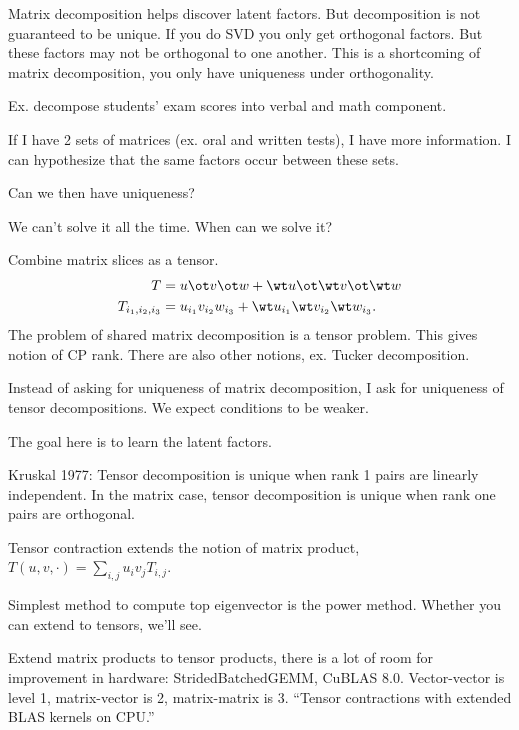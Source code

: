 Matrix decomposition helps discover latent factors. But decomposition is not guaranteed to be unique. If you do SVD you only get orthogonal factors. But these factors may not be orthogonal to one another. This is a shortcoming of matrix decomposition, you only have uniqueness under orthogonality.

Ex. decompose students' exam scores into verbal and math component.

If I have 2 sets of matrices (ex. oral and written tests), I have more information. I can hypothesize that the same factors occur between these sets.


Can we then have uniqueness?

We can't solve it all the time. When can we solve it? %

Combine matrix slices as a tensor.
\begin{align}
T&=u\ot v\ot w + \wt u\ot \wt v \ot \wt w\\
T_{i_1,i_2,i_3}&= u_{i_1}v_{i_2}w_{i_3} + \wt u_{i_1}\wt v_{i_2}\wt w_{i_3}.
\end{align}
The problem of shared matrix decomposition is a tensor problem.
This gives notion of CP rank. There are also other notions, ex.  Tucker decomposition.

Instead of asking for uniqueness of matrix decomposition, I ask for uniqueness of tensor decompositions. We expect conditions to be weaker.

The goal here is to learn the latent factors.

Kruskal 1977: Tensor decomposition is unique when rank 1 pairs are linearly independent. In the matrix case, tensor decomposition is unique when rank one pairs are orthogonal.


Tensor contraction extends the notion of matrix product, $T(u,v,\cdot) = \sum_{i,j} u_iv_j T_{i,j}$. 

Simplest method to compute top eigenvector is the power method. Whether you can extend to tensors, we'll see.

Extend matrix products to tensor products, there is a lot of room for improvement in hardware: StridedBatchedGEMM, CuBLAS 8.0. Vector-vector is level 1, matrix-vector is 2, matrix-matrix is 3. ``Tensor contractions with extended BLAS kernels on CPU.''

